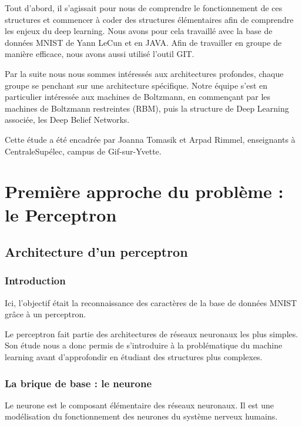 \documentclass[a4paper,oneside]{report}
\begin{document}
            Tout d'abord, il s'agissait pour nous de comprendre le fonctionnement de ces structures et commencer à  coder des structures élémentaires afin de comprendre les enjeux du deep learning. Nous avons pour cela travaillé avec la base de données MNIST de Yann LeCun et en JAVA. Afin de travailler en groupe de manière efficace, nous avons aussi utilisé l'outil GIT.

            Par la suite nous nous sommes intéressés aux architectures profondes, chaque groupe se penchant sur une architecture spécifique. Notre équipe s'est en particulier intéressée aux machines de Boltzmann, en commençant par les machines de Boltzmann restreintes (RBM), puis la structure de Deep Learning associée, les Deep Belief Networks.

            Cette étude a été encadrée par Joanna Tomasik et Arpad Rimmel, enseignants à  CentraleSupélec, campus de Gif-sur-Yvette.



    \part[Le Perceptron]{Première approche du problème : le Perceptron}


        \chapter{Architecture d'un perceptron}

            \section{Introduction}

                Ici, l'objectif était la reconnaissance des caractères de la base de données MNIST grâce à  un perceptron.

                Le perceptron fait partie des architectures de réseaux neuronaux les plus simples. Son étude nous a donc permis de s'introduire à  la problématique du machine learning avant d'approfondir en étudiant des structures plus complexes.


            \section{La brique de base : le neurone}

                Le neurone est le composant élémentaire des réseaux neuronaux. Il est une modélisation du fonctionnement des neurones du système nerveux humains.
\end{document}
